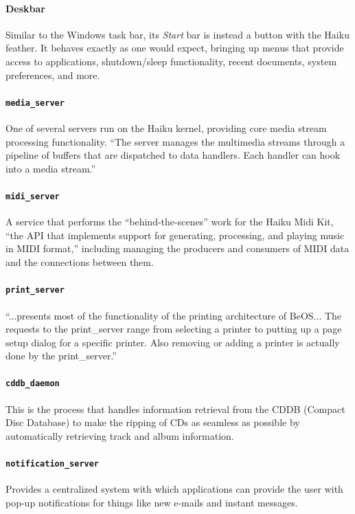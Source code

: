 \documentclass{article}
\begin{document}
\paragraph{Deskbar}
Similar to the Windows task bar, its \textit{Start} bar is instead a
button with the Haiku feather. It behaves exactly as one would expect,
bringing up menus that provide access to applications, shutdown/sleep
functionality, recent documents, system preferences, and
more.\cite{Deskbar}

\paragraph{\texttt{media\_server}}
One of several servers run on the Haiku kernel, providing core media
stream processing functionality. ``The server manages the multimedia 
streams through a pipeline of buffers that are dispatched to data 
handlers. Each handler can hook into a media stream.''
\cite{HaikuMediaServer}

\paragraph{\texttt{midi\_server}}
A service that performs the ``behind-the-scenes'' work for the Haiku
Midi Kit, ``the API that implements support for generating,
processing, and playing music in MIDI format,'' including managing the
producers and consumers of MIDI data and the connections between
them. \cite{HaikuBookMidi}

\paragraph{\texttt{print\_server}}
``...presents most of the functionality of the printing architecture
of BeOS... The requests to the print\_server range from selecting a
printer to putting up a page setup dialog for a specific printer. Also
removing or adding a printer is actually done by the
print\_server.'' \cite{HaikuScripting}

\paragraph{\texttt{cddb\_daemon}}
This is the process that handles information retrieval from the CDDB
(Compact Disc Database) to make the ripping of CDs as seamless as 
possible by automatically retrieving track and album information.

\paragraph{\texttt{notification\_server}}
Provides a centralized system with which applications can provide the 
user with pop-up notifications for things like new e-mails and instant 
messages. \cite{HaikuNotificationServer}
\end{document}
